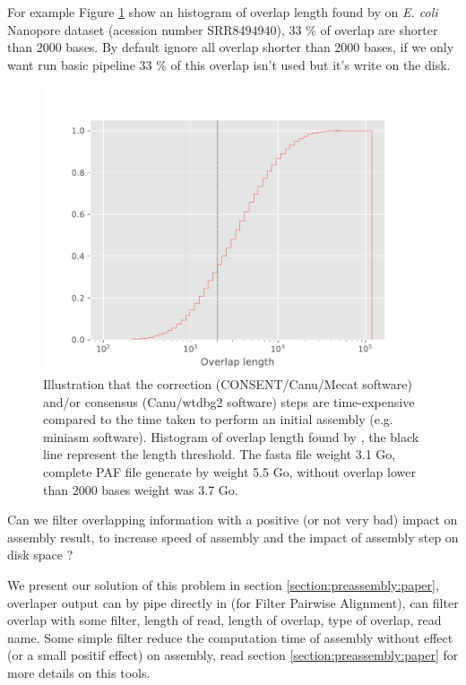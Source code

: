 \documentclass[./main.tex]{subfiles}
\begin{document}
For example Figure \ref{intro:fig:length_overlap_histogram} show an histogram of overlap length found by \minimap on \textit{E. coli} Nanopore dataset (acession number SRR8494940), 33 \% of overlap are shorter than 2000 bases. By default \miniasm ignore all overlap shorter than 2000 bases, if we only want run basic \miniasm pipeline 33 \% of this overlap isn't used but it's write on the disk.

\begin{figure}
    \centering
    \includegraphics[width=\textwidth]{introduction/images/overlap_length.pdf}
    \caption{Illustration that the correction (CONSENT/Canu/Mecat software) and/or consensus (Canu/wtdbg2 software) steps are time-expensive compared to the time taken to perform an initial assembly (e.g. miniasm software). Histogram of overlap length found by \minimap, the black line represent the \miniasm length threshold. The fasta file weight 3.1 Go, complete PAF file generate by \minimap weight 5.5 Go, without overlap lower than 2000 bases weight was 3.7 Go.}
    \label{intro:fig:length_overlap_histogram}
\end{figure}

Can we filter overlapping information with a positive (or not very bad) impact on assembly result, to increase speed of assembly and the impact of assembly step on disk space ?

We present our solution of this problem \fpa in section \ref{section:preassembly:paper}, overlaper output can by pipe directly in \fpa (for Filter Pairwise Alignment), \fpa can filter overlap with some filter, length of read, length of overlap, type of overlap, read name. Some simple \fpa filter reduce the computation time of assembly without effect (or a small positif effect) on assembly, read section \ref{section:preassembly:paper} for more details on this tools.
\end{document}
